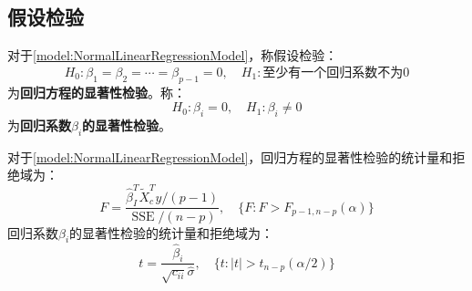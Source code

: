 \subsection{假设检验}
\begin{definition}
	对于\cref{model:NormalLinearRegressionModel}，称假设检验：
	\begin{equation*}
		H_0:\beta_1=\beta_2=\cdots=\beta_{p-1}=0,\quad H_1:\text{至少有一个回归系数不为}0
	\end{equation*}
	为\textbf{回归方程的显著性检验}。称：
	\begin{equation*}
		H_0:\beta_i=0,\quad H_1:\beta_i\ne0
	\end{equation*}
	为\textbf{回归系数$\beta_i$的显著性检验}。
\end{definition}
\begin{theorem}
	对于\cref{model:NormalLinearRegressionModel}，回归方程的显著性检验的统计量和拒绝域为：
	\begin{equation*}
		F=\frac{\hat{\beta}_I^T\tilde{X}_c^Ty/(p-1)}{\operatorname{SSE}/(n-p)},\quad \{F:F>F_{p-1,n-p}(\alpha)\}
	\end{equation*}
	回归系数$\beta_i$的显著性检验的统计量和拒绝域为：
	\begin{equation*}
		t=\frac{\hat{\beta}_i}{\sqrt{c_{ii}}\hat{\sigma}},\quad\{t:|t|>t_{n-p}(\alpha/2)\}
	\end{equation*}
\end{theorem}
